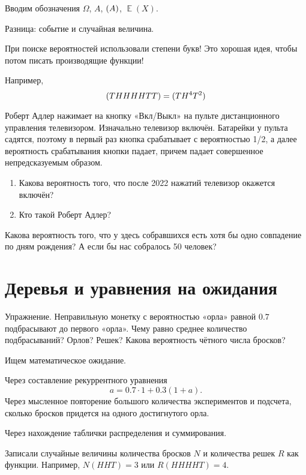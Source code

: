 \documentclass[12pt]{article}
\DeclareMathOperator{\E}{\mathbb{E}}
\let\P\relax
\DeclareMathOperator{\P}{\mathbb{P}}
\theoremstyle{definition}
\begin{document}
Вводим обозначения $\Omega$, $A$, $\P(A)$, $\E(X)$.

Разница: событие и случайная величина.

При поиске вероятностей использовали степени букв! 
Это хорошая идея, чтобы потом писать производящие функции!

Например,
\[
\P(THHHHTT) = \P(TH^4T^2)  
\]





Роберт Адлер нажимает на кнопку «Вкл/Выкл» на пульте дистанционного
управления телевизором. Изначально телевизор включён. Батарейки
у пульта садятся, поэтому в первый раз кнопка срабатывает с вероятностью
1/2, а далее вероятность срабатывания кнопки падает, причем падает совершенное непредсказуемым образом. 

\begin{enumerate}
  \item Какова вероятность того, что после 2022 нажатий телевизор окажется включён?
  \item Кто такой Роберт Адлер?
\end{enumerate}



Какова вероятность того, что у здесь собравшихся есть хотя бы одно совпадение по дням рождения?
А если бы нас собралось 50 человек?


\section{Деревья и уравнения на ожидания}

Упражнение. Неправильную монетку с вероятностью «орла» равной $0.7$ подбрасывают до первого «орла».
Чему равно среднее количество подбрасываний?  Орлов? Решек? Какова вероятность чётного числа бросков? 

Ищем математическое ожидание. 

Через составление рекуррентного уравнения
\[
a = 0.7 \cdot 1 + 0.3 (1 + a).
\]
Через мысленное повторение большого количества экспериментов и подсчета, сколько бросков придется на одного достигнутого орла. 

Через нахождение таблички распределения и суммирования. 

Записали случайные величины количества бросков $N$ и количества решек $R$ как функции. 
Например, $N(HHT) = 3$ или $R(HHHHT)= 4$.
\end{document}
